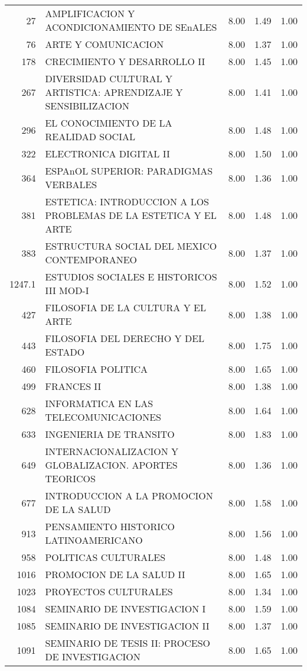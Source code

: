 \documentclass[12pt]{article}
\begin{document}
\begin{table}[ht]
\begin{tabular}{rlrrr}
  27 & AMPLIFICACION Y ACONDICIONAMIENTO DE SEnALES & 8.00 & 1.49 & 1.00 \\ 
  76 & ARTE Y COMUNICACION & 8.00 & 1.37 & 1.00 \\ 
  178 & CRECIMIENTO Y DESARROLLO II & 8.00 & 1.45 & 1.00 \\ 
  267 & DIVERSIDAD CULTURAL Y ARTISTICA: APRENDIZAJE Y SENSIBILIZACION & 8.00 & 1.41 & 1.00 \\ 
  296 & EL CONOCIMIENTO DE LA REALIDAD SOCIAL & 8.00 & 1.48 & 1.00 \\ 
  322 & ELECTRONICA DIGITAL II & 8.00 & 1.50 & 1.00 \\ 
  364 & ESPAnOL SUPERIOR: PARADIGMAS VERBALES & 8.00 & 1.36 & 1.00 \\ 
  381 & ESTETICA: INTRODUCCION A LOS PROBLEMAS DE LA ESTETICA Y EL ARTE & 8.00 & 1.48 & 1.00 \\ 
  383 & ESTRUCTURA SOCIAL DEL MEXICO CONTEMPORANEO & 8.00 & 1.37 & 1.00 \\ 
  1247.1 & ESTUDIOS SOCIALES E HISTORICOS III MOD-I & 8.00 & 1.52 & 1.00 \\ 
  427 & FILOSOFIA DE LA CULTURA Y EL ARTE & 8.00 & 1.38 & 1.00 \\ 
  443 & FILOSOFIA DEL DERECHO Y DEL ESTADO & 8.00 & 1.75 & 1.00 \\ 
  460 & FILOSOFIA POLITICA & 8.00 & 1.65 & 1.00 \\ 
  499 & FRANCES II & 8.00 & 1.38 & 1.00 \\ 
  628 & INFORMATICA EN LAS TELECOMUNICACIONES & 8.00 & 1.64 & 1.00 \\ 
  633 & INGENIERIA DE TRANSITO & 8.00 & 1.83 & 1.00 \\ 
  649 & INTERNACIONALIZACION Y GLOBALIZACION. APORTES TEORICOS & 8.00 & 1.36 & 1.00 \\ 
  677 & INTRODUCCION A LA PROMOCION DE LA SALUD & 8.00 & 1.58 & 1.00 \\ 
  913 & PENSAMIENTO HISTORICO LATINOAMERICANO & 8.00 & 1.56 & 1.00 \\ 
  958 & POLITICAS CULTURALES & 8.00 & 1.48 & 1.00 \\ 
  1016 & PROMOCION DE LA SALUD II & 8.00 & 1.65 & 1.00 \\ 
  1023 & PROYECTOS CULTURALES & 8.00 & 1.34 & 1.00 \\ 
  1084 & SEMINARIO DE INVESTIGACION I & 8.00 & 1.59 & 1.00 \\ 
  1085 & SEMINARIO DE INVESTIGACION II & 8.00 & 1.37 & 1.00 \\ 
  1091 & SEMINARIO DE TESIS II: PROCESO DE INVESTIGACION & 8.00 & 1.65 & 1.00 \\ 

\end{tabular}
\end{table}
\end{document}
